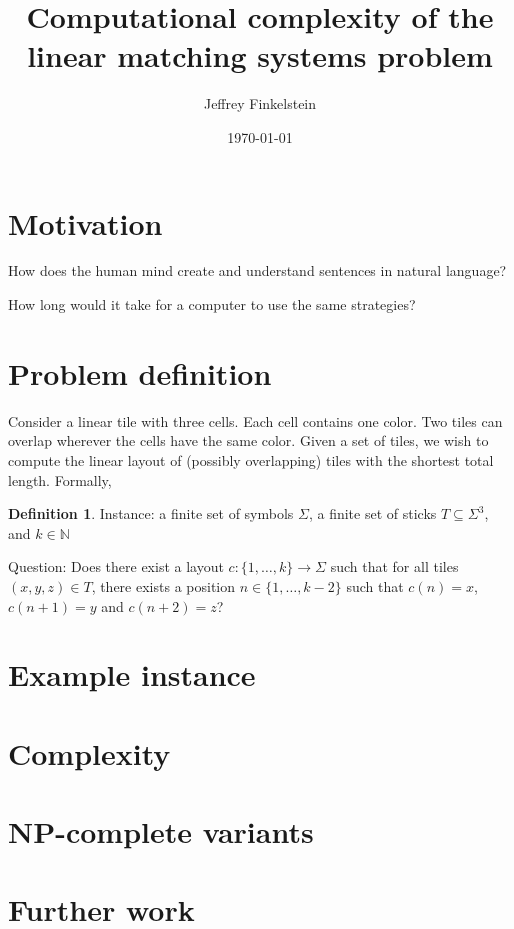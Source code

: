 \documentclass{lposter}
\title{Computational complexity of the linear matching systems problem}
\author{Jeffrey Finkelstein}
\date{\today}
\theoremstyle{definition} \newtheorem*{definition}{Definition}
\begin{document}
\begin{poster}

\section{Motivation}

How does the human mind create and understand sentences in natural language?

How long would it take for a computer to use the same strategies?

\section{Problem definition}

Consider a linear tile with three cells. Each cell contains one color. Two
tiles can overlap wherever the cells have the same color. Given a set of tiles,
we wish to compute the linear layout of (possibly overlapping) tiles with the
shortest total length. Formally,


\begin{definition}
  Instance: a finite set of symbols $\Sigma$, a finite set of sticks
  $T\subseteq\Sigma^3$, and $k\in\mathbb{N}$

  Question: Does there exist a layout $c\colon\{1,\ldots,k\}\to\Sigma$ such
  that for all tiles $(x, y, z)\in T$, there exists a position
  $n\in\{1,\ldots,k-2\}$ such that $c(n)=x$, $c(n+1)=y$ and $c(n+2)=z$?
\end{definition}

\section{Example instance}

\section{Complexity}

\section{NP-complete variants}

\section{Further work}



\end{poster}
\end{document}
